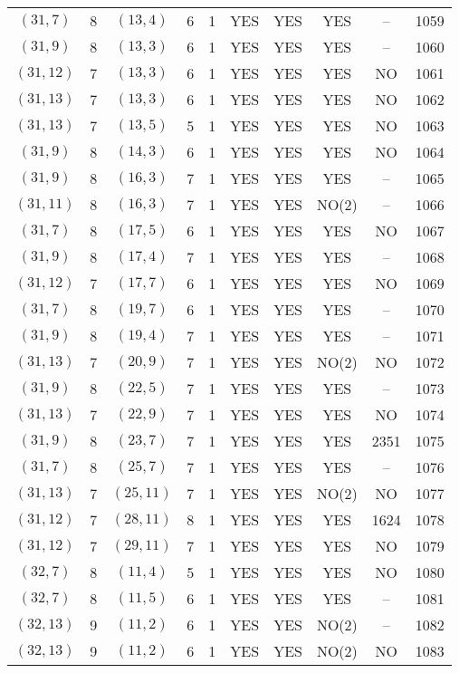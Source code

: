 \begin{longtable}{|c|c|c|c|c|c|c|c|c|c|}
$(31, 7)$ & 8 & $(13, 4)$ & 6 & 1 & YES & YES & YES & -- & 1059\\
$(31, 9)$ & 8 & $(13, 3)$ & 6 & 1 & YES & YES & YES & -- & 1060\\
$(31, 12)$ & 7 & $(13, 3)$ & 6 & 1 & YES & YES & YES & NO & 1061\\
$(31, 13)$ & 7 & $(13, 3)$ & 6 & 1 & YES & YES & YES & NO & 1062\\
$(31, 13)$ & 7 & $(13, 5)$ & 5 & 1 & YES & YES & YES & NO & 1063\\
$(31, 9)$ & 8 & $(14, 3)$ & 6 & 1 & YES & YES & YES & NO & 1064\\
$(31, 9)$ & 8 & $(16, 3)$ & 7 & 1 & YES & YES & YES & -- & 1065\\
$(31, 11)$ & 8 & $(16, 3)$ & 7 & 1 & YES & YES & NO(2) & -- & 1066\\
$(31, 7)$ & 8 & $(17, 5)$ & 6 & 1 & YES & YES & YES & NO & 1067\\
$(31, 9)$ & 8 & $(17, 4)$ & 7 & 1 & YES & YES & YES & -- & 1068\\
$(31, 12)$ & 7 & $(17, 7)$ & 6 & 1 & YES & YES & YES & NO & 1069\\
$(31, 7)$ & 8 & $(19, 7)$ & 6 & 1 & YES & YES & YES & -- & 1070\\
$(31, 9)$ & 8 & $(19, 4)$ & 7 & 1 & YES & YES & YES & -- & 1071\\
$(31, 13)$ & 7 & $(20, 9)$ & 7 & 1 & YES & YES & NO(2) & NO & 1072\\
$(31, 9)$ & 8 & $(22, 5)$ & 7 & 1 & YES & YES & YES & -- & 1073\\
$(31, 13)$ & 7 & $(22, 9)$ & 7 & 1 & YES & YES & YES & NO & 1074\\
$(31, 9)$ & 8 & $(23, 7)$ & 7 & 1 & YES & YES & YES & 2351 & 1075\\
$(31, 7)$ & 8 & $(25, 7)$ & 7 & 1 & YES & YES & YES & -- & 1076\\
$(31, 13)$ & 7 & $(25, 11)$ & 7 & 1 & YES & YES & NO(2) & NO & 1077\\
$(31, 12)$ & 7 & $(28, 11)$ & 8 & 1 & YES & YES & YES & 1624 & 1078\\
$(31, 12)$ & 7 & $(29, 11)$ & 7 & 1 & YES & YES & YES & NO & 1079\\
$(32, 7)$ & 8 & $(11, 4)$ & 5 & 1 & YES & YES & YES & NO & 1080\\
$(32, 7)$ & 8 & $(11, 5)$ & 6 & 1 & YES & YES & YES & -- & 1081\\
$(32, 13)$ & 9 & $(11, 2)$ & 6 & 1 & YES & YES & NO(2) & -- & 1082\\
$(32, 13)$ & 9 & $(11, 2)$ & 6 & 1 & YES & YES & NO(2) & NO & 1083\\

\end{longtable}

